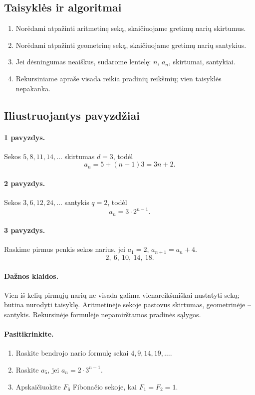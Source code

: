 \subsection{Taisyklės ir algoritmai}

\begin{enumerate}
\item Norėdami atpažinti aritmetinę seką, skaičiuojame gretimų narių skirtumus.
\item Norėdami atpažinti geometrinę seką, skaičiuojame gretimų narių santykius.
\item Jei dėsningumas neaiškus, sudarome lentelę: $n$, $a_n$, skirtumai, santykiai.
\item Rekursiniame apraše visada reikia pradinių reikšmių; vien taisyklės nepakanka.
\end{enumerate}

\subsection{Iliustruojantys pavyzdžiai}

\paragraph{1 pavyzdys.}
Sekos $5,8,11,14,\ldots$ skirtumas $d=3$, todėl
\[
a_n=5+(n-1)3=3n+2.
\]

\paragraph{2 pavyzdys.}
Sekos $3,6,12,24,\ldots$ santykis $q=2$, todėl
\[
a_n=3\cdot2^{n-1}.
\]

\paragraph{3 pavyzdys.}
Raskime pirmus penkis sekos narius, jei $a_1=2$, $a_{n+1}=a_n+4$.
\[
2,\ 6,\ 10,\ 14,\ 18.
\]

\paragraph{Dažnos klaidos.}
Vien iš kelių pirmųjų narių ne visada galima vienareikšmiškai nustatyti seką; būtina nurodyti taisyklę. Aritmetinėje sekoje pastovus skirtumas, geometrinėje -- santykis. Rekursinėje formulėje nepamirštamos pradinės sąlygos.

\paragraph{Pasitikrinkite.}
\begin{enumerate}
\item Raskite bendrojo nario formulę sekai $4,9,14,19,\ldots$.
\item Raskite $a_5$, jei $a_n=2\cdot3^{n-1}$.
\item Apskaičiuokite $F_6$ Fibonačio sekoje, kai $F_1=F_2=1$.
\end{enumerate}

